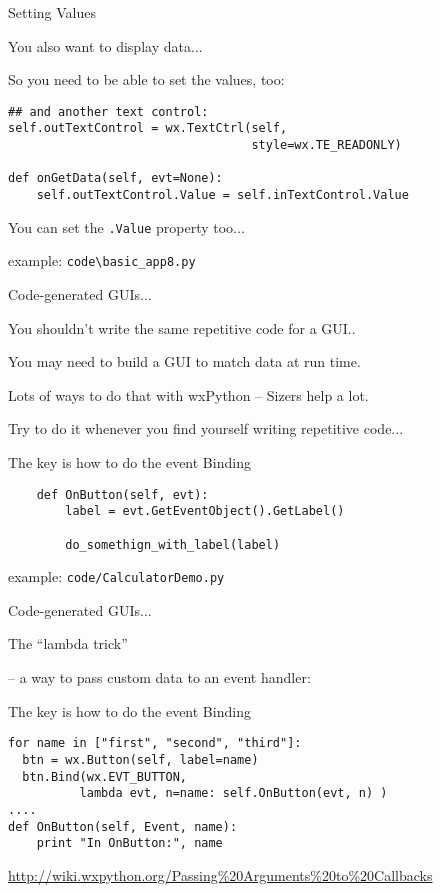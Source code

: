 \documentclass{beamer}
\begin{document}
\begin{frame}[fragile]{Setting Values}

{\Large You also want to display data...}

\vfill
{\large So you need to be able to set the values, too:}

\begin{verbatim}
## and another text control:
self.outTextControl = wx.TextCtrl(self,
                                  style=wx.TE_READONLY)

def onGetData(self, evt=None):        
    self.outTextControl.Value = self.inTextControl.Value
\end{verbatim}

{\large You can set the \verb`.Value` property too...}

\vfill
{\large example: \verb`code\basic_app8.py`}

\end{frame}


\begin{frame}[fragile]{Code-generated GUIs...}

\vfill
{\large You shouldn't write the same repetitive code for a GUI..}

\vfill
{\large You may need to build a GUI to match data at run time.}

\vfill
{\large Lots of ways to do that with wxPython -- Sizers help a lot.}

\vfill
{\large Try to do it whenever you find yourself writing repetitive code...}

\vfill
{\large The key is how to do the event Binding}
\begin{verbatim}
    def OnButton(self, evt):        
        label = evt.GetEventObject().GetLabel()

        do_somethign_with_label(label)
\end{verbatim}
\vfill
example: \verb`code/CalculatorDemo.py`
\end{frame}


\begin{frame}[fragile]{Code-generated GUIs...}

\vfill
{\Large The ``lambda trick''}

\vfill
{\large -- a way to pass custom data to an event handler:}

\vfill
{\large The key is how to do the event Binding}
\begin{verbatim}
for name in ["first", "second", "third"]:
  btn = wx.Button(self, label=name)
  btn.Bind(wx.EVT_BUTTON,
          lambda evt, n=name: self.OnButton(evt, n) )
....
def OnButton(self, Event, name):
    print "In OnButton:", name

\end{verbatim}

\vfill
\url{http://wiki.wxpython.org/Passing%20Arguments%20to%20Callbacks}
\end{frame}
\end{document}
